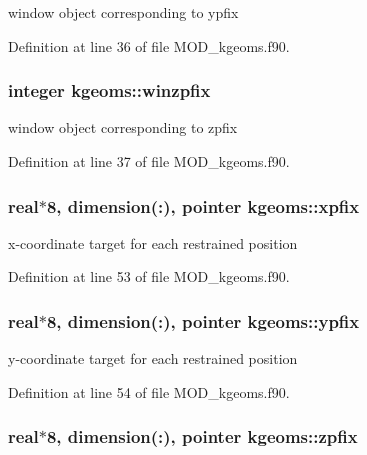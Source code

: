 window object corresponding to ypfix 



Definition at line 36 of file M\-O\-D\-\_\-kgeoms.\-f90.

\hypertarget{classkgeoms_ad8e2ec8f4c20787f0d0420c916852997}{
\subsubsection[{winzpfix}]{\setlength{\rightskip}{0pt plus 5cm}integer kgeoms\-::winzpfix}}\label{classkgeoms_ad8e2ec8f4c20787f0d0420c916852997}


window object corresponding to zpfix 



Definition at line 37 of file M\-O\-D\-\_\-kgeoms.\-f90.

\hypertarget{classkgeoms_aa84ac15683e8fab1296d944846714969}{
\subsubsection[{xpfix}]{\setlength{\rightskip}{0pt plus 5cm}real$\ast$8, dimension(\-:), pointer kgeoms\-::xpfix}}\label{classkgeoms_aa84ac15683e8fab1296d944846714969}


x-\/coordinate target for each restrained position 



Definition at line 53 of file M\-O\-D\-\_\-kgeoms.\-f90.

\hypertarget{classkgeoms_aa91e2cdd75365eab73918fbbdd6b18fb}{
\subsubsection[{ypfix}]{\setlength{\rightskip}{0pt plus 5cm}real$\ast$8, dimension(\-:), pointer kgeoms\-::ypfix}}\label{classkgeoms_aa91e2cdd75365eab73918fbbdd6b18fb}


y-\/coordinate target for each restrained position 



Definition at line 54 of file M\-O\-D\-\_\-kgeoms.\-f90.

\hypertarget{classkgeoms_a5b73b12755cab58ec5104cd43a770b07}{
\subsubsection[{zpfix}]{\setlength{\rightskip}{0pt plus 5cm}real$\ast$8, dimension(\-:), pointer kgeoms\-::zpfix}}\label{classkgeoms_a5b73b12755cab58ec5104cd43a770b07}


